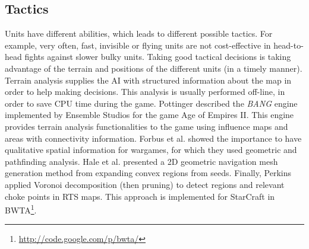 \documentclass[journal]{IEEEtran}
\begin{document}

\subsection{Tactics}
Units have different abilities, which leads to different possible tactics. For example, very often, fast, invisible or flying units are not cost-effective in head-to-head fights against slower bulky units. Taking good tactical decisions is taking advantage of the terrain and positions of the different units (in a timely manner). Terrain analysis supplies the AI with structured information about the map in order to help making decisions. This analysis is usually performed off-line, in order to save CPU time during the game. Pottinger \cite{Pottinger00} described the \emph{BANG} engine implemented by Ensemble Studios for the game Age of Empires II. This engine provides terrain analysis functionalities to the game using influence maps and areas with connectivity information. Forbus et al. \cite{Forbus2002} showed the importance to have qualitative spatial information for wargames, for which they used geometric and pathfinding analysis. Hale et al. \cite{Hale08} presented a 2D geometric navigation mesh generation method from expanding convex regions from seeds. Finally, Perkins \cite{Perkins10} applied Voronoi decomposition (then pruning) %
to detect regions and relevant choke points in RTS maps. This approach is implemented for StarCraft in BWTA\footnote{\url{http://code.google.com/p/bwta/}}.
\end{document}
